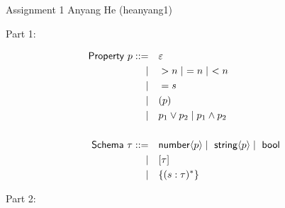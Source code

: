 \documentclass[11pt]{article}
\newcommand{\prop}[1]{\langle{#1}\rangle}%
\begin{document}
\hwtitle
{Assignment 1}
{Anyang He (heanyang1)} %


Part 1:

\begin{alignat*}{1}
  \msf{Property}~p ::= \qamp \varepsilon                                       \\
  \mid \qamp >n \mid\ =n \mid\ <n                                              \\
  \mid \qamp =s                                                                \\
  \mid \qamp (p)                                                               \\
  \mid \qamp p_1 \vee p_2 \mid p_1 \wedge p_2                                  \\
  \\
  \msf{Schema}~\tau ::= \qamp \tnum \prop{p} \mid\ \tstr \prop{p} \mid\ \tbool \\
  \mid \qamp [\tau]                                                            \\
  \mid \qamp \{(s:\tau)^*\}                                                    \\
\end{alignat*}

Part 2:
\end{document}
